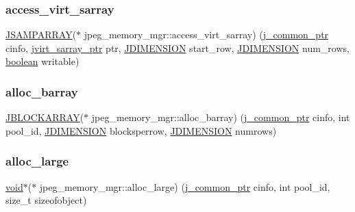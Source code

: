 \subsubsection{\texorpdfstring{access\+\_\+virt\+\_\+sarray}{access\_virt\_sarray}}
{\footnotesize\ttfamily \hyperlink{jpeglib_8h_ac9d5d1b829ed51769db69a37271a7e91}{J\+S\+A\+M\+P\+A\+R\+R\+AY}($\ast$ jpeg\+\_\+memory\+\_\+mgr\+::access\+\_\+virt\+\_\+sarray) (\hyperlink{jpeglib_8h_a1a177ab705cefea8f30ec31a48e62650}{j\+\_\+common\+\_\+ptr} cinfo, \hyperlink{jpeglib_8h_abc0b975077507c35b5a577e3ce9e4d91}{jvirt\+\_\+sarray\+\_\+ptr} ptr, \hyperlink{jmorecfg_8h_a04ed4674f6f1d0d50ec241531e38274f}{J\+D\+I\+M\+E\+N\+S\+I\+ON} start\+\_\+row, \hyperlink{jmorecfg_8h_a04ed4674f6f1d0d50ec241531e38274f}{J\+D\+I\+M\+E\+N\+S\+I\+ON} num\+\_\+rows, \hyperlink{jconfig_8h_a7670a4e8a07d9ebb00411948b0bbf86d}{boolean} writable)}

\mbox{\label{structjpeg__memory__mgr_a59ff5a509aaecceb578d7c50ad29408e}} 
\subsubsection{\texorpdfstring{alloc\+\_\+barray}{alloc\_barray}}
{\footnotesize\ttfamily \hyperlink{jpeglib_8h_ab03cfeb937b60b9b73ca6e3cf935af49}{J\+B\+L\+O\+C\+K\+A\+R\+R\+AY}($\ast$ jpeg\+\_\+memory\+\_\+mgr\+::alloc\+\_\+barray) (\hyperlink{jpeglib_8h_a1a177ab705cefea8f30ec31a48e62650}{j\+\_\+common\+\_\+ptr} cinfo, int pool\+\_\+id, \hyperlink{jmorecfg_8h_a04ed4674f6f1d0d50ec241531e38274f}{J\+D\+I\+M\+E\+N\+S\+I\+ON} blocksperrow, \hyperlink{jmorecfg_8h_a04ed4674f6f1d0d50ec241531e38274f}{J\+D\+I\+M\+E\+N\+S\+I\+ON} numrows)}

\mbox{\label{structjpeg__memory__mgr_a92f58136389a42228d4380e0f16a16ab}} 
\subsubsection{\texorpdfstring{alloc\+\_\+large}{alloc\_large}}
{\footnotesize\ttfamily \hyperlink{png_8h_ac9c84fa68bbad002983e35ce3663c686}{void}$\ast$($\ast$ jpeg\+\_\+memory\+\_\+mgr\+::alloc\+\_\+large) (\hyperlink{jpeglib_8h_a1a177ab705cefea8f30ec31a48e62650}{j\+\_\+common\+\_\+ptr} cinfo, int pool\+\_\+id, size\+\_\+t sizeofobject)}

